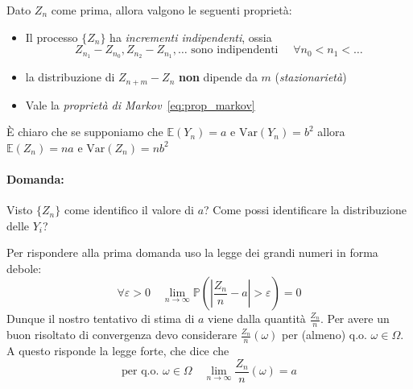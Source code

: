\begin{proposition}{}
    Dato \(Z_{n}\) come prima, allora valgono le seguenti proprietà:
\begin{itemize}[label = --]
    \item Il processo \(\{Z_{n}\} \) ha \emph{incrementi indipendenti}, ossia 
    \[
      Z_{n_{1}} - Z_{n_{0}} , Z_{n_{2}}  - Z_{n_{1}} , \dots \text{ sono
      indipendenti } \quad \forall n_{0} < n_{1} < \dots
    \]
    \item la distribuzione di \(Z_{n+m} - Z_n\) \textbf{non} dipende da \(m\)
        (\emph{stazionarietà})
    \item Vale la \emph{proprietà di Markov}~\eqref{eq:prop_markov}
\end{itemize}
\end{proposition}

È chiaro che se supponiamo che \(\mathbb{E}{(Y_{n})}= a\) e
\(\mathrm{Var}{(Y_{n})} = b^2\) allora \(\mathbb{E}{(Z_{n})} = na\) e
\(\mathrm{Var}{(Z_{n})} = nb^2\) 

\paragraph{Domanda:} Visto \(\{Z_{n}\} \) come identifico il valore di \(a\)?
Come possi identificare la distribuzione delle \(Y_{i}\)?

Per rispondere alla prima domanda uso la legge dei grandi numeri in forma
debole:
\[
  \forall \varepsilon > 0 \quad  \lim _{n \to \infty} \mathbb{P}{\left( \left|
  \frac{Z_{n}}{n} - a \right| > \varepsilon\right)} = 0
\]
Dunque il nostro tentativo di stima di \(a\) viene dalla quantità
\(\frac{Z_{n}}{n}\). Per avere un buon risoltato di convergenza devo considerare
\(\frac{Z_{n}}{n}{(\omega)}\) per (almeno) q.o. \(\omega \in \Omega\). A questo
risponde la legge forte, che dice che
\[
  \text{per q.o. } \omega \in \Omega \quad  \lim_{n \to \infty}
  \frac{Z_{n}}{n}{(\omega)} = a 
\]
